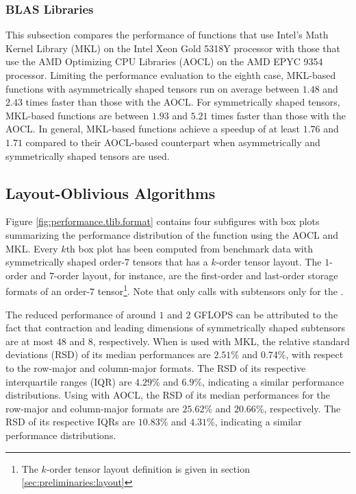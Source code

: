 \subsubsection{BLAS Libraries}
This subsection compares the performance of functions that use Intel's Math Kernel Library (MKL) on the Intel Xeon Gold 5318Y processor with those that use the AMD Optimizing CPU Libraries (AOCL) on the AMD EPYC 9354 processor. 
Limiting the performance evaluation to the eighth case, MKL-based functions with asymmetrically shaped tensors run on average between $1.48$ and $2.43$ times faster than those with the AOCL.
For symmetrically shaped tensors, MKL-based functions are between $1.93$ and $5.21$ times faster than those with the AOCL.
In general, MKL-based functions achieve a speedup of at least $1.76$ and $1.71$  compared to their AOCL-based counterpart when asymmetrically and symmetrically shaped tensors are used.


\subsection{Layout-Oblivious Algorithms}
Figure \ref{fig:performance.tlib.format} contains four subfigures with box plots summarizing the performance distribution of the  function using the AOCL and MKL.
Every $k$th box plot has been computed from benchmark data with symmetrically shaped order-$7$ tensors that has a $k$-order tensor layout.
The $1$-order and $7$-order layout, for instance, are the first-order and last-order storage formats of an order-$7$ tensor\footnote{The $k$-order tensor layout definition is given in section \ref{sec:preliminaries:layout}}.
Note that  only calls  with subtensors only for the .

The reduced performance of around $1$ and $2$ GFLOPS can be attributed to the fact that contraction and leading dimensions of symmetrically shaped subtensors are at most $48$ and $8$, respectively.
When  is used with MKL, the relative standard deviations (RSD) of its median performances are $2.51$\% and $0.74$\%, with respect to the row-major and column-major formats.
The RSD of its respective interquartile ranges (IQR) are $4.29$\% and $6.9$\%, indicating a similar performance distributions.
Using  with AOCL, the RSD of its median performances for the row-major and column-major formats are $25.62$\% and $20.66$\%, respectively.
The RSD of its respective IQRs are $10.83$\% and $4.31$\%, indicating a similar performance distributions.

